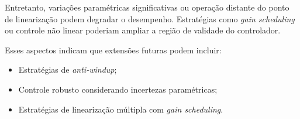Entretanto, variações paramétricas significativas ou operação distante do ponto de linearização podem degradar o desempenho. Estratégias como \textit{gain scheduling} ou controle não linear poderiam ampliar a região de validade do controlador.

Esses aspectos indicam que extensões futuras podem incluir:

\begin{itemize}
    \item Estratégias de \textit{anti-windup};
    \item Controle robusto considerando incertezas paramétricas;
    \item Estratégias de linearização múltipla com \textit{gain scheduling}.
\end{itemize}

